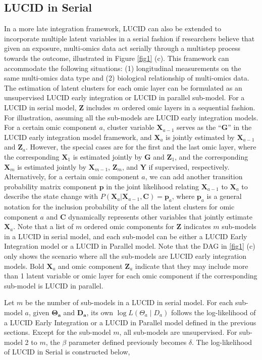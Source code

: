 \subsection{LUCID in Serial} \label{sec_serial}
In a more late integration framework, LUCID can also be extended to incorporate multiple latent variables in a serial fashion if researchers believe that given an exposure, multi-omics data act serially through a multistep process towards the outcome, illustrated in Figure \ref{fig1} (c). This framework can accommodate the following situations: (1) longitudinal measurements on the same multi-omics data type and (2) biological relationship of multi-omics data. The estimation of latent clusters for each omic layer can be formulated as an unsupervised LUCID early integration or LUCID in parallel sub-model. For a LUCID in serial model, $\bm Z$ includes $m$ ordered omic layers in a sequential fashion. For illustration, assuming all the sub-models are LUCID early integration models. For a certain omic component $a$, cluster variable $\bm X_{a - 1}$ serves as the “$\bm G$” in the LUCID early integration model framework, and $\bm X_a$ is jointly estimated by $\bm X_{a - 1}$ and $\bm Z_a$. However, the special cases are for the first and the last omic layer, where the corresponding $\bm X_{1}$ is estimated jointly by $\bm G$ and $\bm Z_1$, and the corresponding $\bm X_{m}$ is estimated jointly by $\bm X_{m - 1}$, $\bm Z_m$, and $\bm Y$ if supervised, respectively. Alternatively, for a certain omic component $a$, we can add another transition probability matrix component $\bm p$ in the joint likelihood relating $\bm X_{a - 1}$ to $\bm X_a$ to describe the state change with $P(\bm X_a|\bm X_{a - 1}, \bm C) = \bm p_a$, where $\bm p_a$ is a general notation for the inclusion probability of the all the latent clusters for omic component $a$ and $\bm C$ dynamically represents other variables that jointly estimate $\bm X_{a}$. Note that a list of $m$ ordered omic components for $\bm Z$ indicates $m$ sub-models in a LUCID in serial model, and each sub-model can be either a LUCID Early Integration model or a LUCID in Parallel model. Note that the DAG in \ref{fig1} (c) only shows the scenario where all the sub-models are LUCID early integration models. Bold $\bm X_{a}$ and omic component $\bm Z_a$ indicate that they may include more than 1 latent variable or omic layer for each omic component if the corresponding sub-model is LUCID in parallel. 

Let $m$ be the number of sub-models in a LUCID in serial model. For each sub-model $a$, given $\bm{\Theta_a}$ and $\bm{D_a}$, its own $\log L({\Theta_a} \mid {D_a})$ follows the log-likelihood of a LUCID Early Integration or a LUCID in Parallel model defined in the previous sections. Except for the sub-model $m$, all sub-models are unsupervised. For sub-model 2 to $m$, the $\beta$ parameter defined previously becomes $\delta$. The log-likelihood of LUCID in Serial is constructed below,

